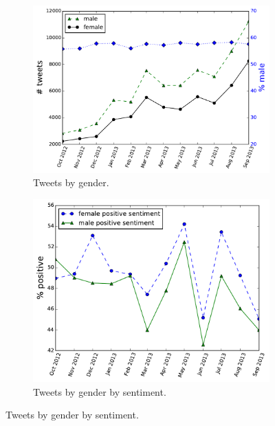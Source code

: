 \documentclass{sig-alternate}
\begin{document}
\begin{figure}[t]
  \caption{Tweets by gender and sentiment.}
  \begin{subfigure}{\columnwidth}
    \centering
    \caption{Tweets by gender. \label{f.gender}}
    \includegraphics[width=\columnwidth]{nb/gender.pdf}
  \end{subfigure}
  \begin{subfigure}{.93\columnwidth}
    \centering
    \caption{Tweets by gender by sentiment.  \label{f.gender.sentiment}}
    \includegraphics[width=\columnwidth]{nb/gender_sentiment.pdf}
  \end{subfigure}
\end{figure}
\end{document}
